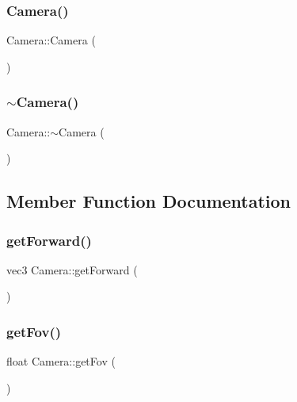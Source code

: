 \mbox{\label{classCamera_a01f94c3543f56ede7af49dc778f19331}} 
\subsubsection{\texorpdfstring{Camera()}{Camera()}\hspace{0.1cm}{\footnotesize\ttfamily [2/2]}}
{\footnotesize\ttfamily Camera\+::\+Camera (\begin{DoxyParamCaption}{ }\end{DoxyParamCaption})}

\mbox{\label{classCamera_ad1897942d0ccf91052386388a497349f}} 
\subsubsection{\texorpdfstring{$\sim$\+Camera()}{~Camera()}}
{\footnotesize\ttfamily Camera\+::$\sim$\+Camera (\begin{DoxyParamCaption}{ }\end{DoxyParamCaption})}



\subsection{Member Function Documentation}
\mbox{\label{classCamera_a530fa6698a43a61be7a78d60dddb45c2}} 
\subsubsection{\texorpdfstring{get\+Forward()}{getForward()}}
{\footnotesize\ttfamily vec3 Camera\+::get\+Forward (\begin{DoxyParamCaption}{ }\end{DoxyParamCaption})}

\mbox{\label{classCamera_a71e957327f96cd913cd1ecd7d42c35e3}} 
\subsubsection{\texorpdfstring{get\+Fov()}{getFov()}}
{\footnotesize\ttfamily float Camera\+::get\+Fov (\begin{DoxyParamCaption}{ }\end{DoxyParamCaption})}

